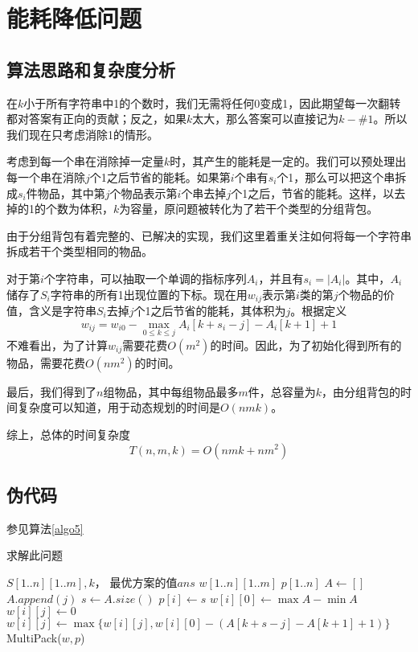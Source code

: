 \documentclass[UTF8]{ctexart}
\begin{document}
\section{能耗降低问题}
    \subsection*{算法思路和复杂度分析}
        在$k$小于所有字符串中1的个数时，我们无需将任何0变成1，因此期望每一次翻转都对答案有正向的贡献；反之，如果$k$太大，那么答案可以直接记为$k-\#1$。所以我们现在只考虑消除1的情形。
        
        考虑到每一个串在消除掉一定量$k$时，其产生的能耗是一定的。我们可以预处理出每一个串在消除$j$个1之后节省的能耗。如果第$i$个串有$s_i$个1，那么可以把这个串拆成$s_i$件物品，其中第$j$个物品表示第$i$个串去掉$j$个1之后，节省的能耗。这样，以去掉的1的个数为体积，$k$为容量，原问题被转化为了若干个类型的分组背包。

        由于分组背包有着完整的、已解决的实现，我们这里着重关注如何将每一个字符串拆成若干个类型相同的物品。

        对于第$i$个字符串，可以抽取一个单调的指标序列$A_i$，并且有$s_i = |A_i|$。其中，$A_i$储存了$S_i$字符串的所有1出现位置的下标。现在用$w_{ij}$表示第$i$类的第$j$个物品的价值，含义是字符串$S_i$去掉$j$个1之后节省的能耗，其体积为$j$。根据定义
        $$w_{ij} = w_{i0} - \max_{0 \leq k \leq j}{A_i[k+s_i-j]-A_i[k+1]+1}$$
        不难看出，为了计算$w_{ij}$需要花费$O(m^2)$的时间。因此，为了初始化得到所有的物品，需要花费$O(nm^2)$的时间。

        最后，我们得到了$n$组物品，其中每组物品最多$m$件，总容量为$k$，由分组背包的时间复杂度可以知道，用于动态规划的时间是$O(nmk)$。

        综上，总体的时间复杂度
        $$T(n, m, k) = O(nmk+nm^2)$$

    \subsection*{伪代码}
    参见算法\ref{algo5}
    \begin{algorithm}
        \caption{求解此问题}
        \begin{algorithmic}[1]
            \Require $S[1..n][1..m], k$，
            \Ensure 最优方案的值$ans$
                \State $w[1..n][1..m]$
                \State $p[1..n]$
                    \State $A\gets []$
                            \State $A.append(j)$
                        \EndIf
                    \EndFor
                    \State $s\gets A.size()$
                    \State $p[i]\gets s$
                    \State $w[i][0] \gets \max{A}-\min{A}$
                        \State $w[i][j] \gets 0$
                            \State $w[i][j] \gets \max{\{w[i][j], w[i][0]-(A[k+s-j]-A[k+1]+1)\}}$
                        \EndFor
                    \EndFor
                \EndFor
                \State \Return MultiPack($w, p$)
            \EndFunction
        \end{algorithmic}
        \label{algo5}
    \end{algorithm}
\end{document}
